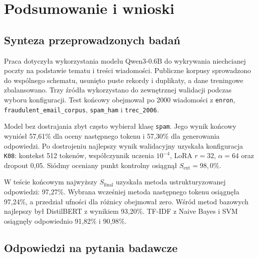 \chapter{Podsumowanie i wnioski}

\section{Synteza przeprowadzonych badań}

Praca dotyczyła wykorzystania modelu Qwen3-0.6B do wykrywania niechcianej
poczty na podstawie tematu i treści wiadomości. Publiczne korpusy sprowadzono
do wspólnego schematu, usunięto puste rekordy i duplikaty, a dane treningowe
zbalansowano. Trzy źródła wykorzystano do zewnętrznej walidacji podczas wyboru
konfiguracji. Test końcowy obejmował po 2000 wiadomości z \texttt{enron},
\texttt{fraudulent\_email\_corpus}, \texttt{spam\_ham} i \texttt{trec\_2006}.

Model bez dostrajania zbyt często wybierał klasę \texttt{spam}. Jego wynik
końcowy wyniósł 57,61\% dla oceny następnego tokenu i 57,30\% dla generowania
odpowiedzi. Po dostrojeniu najlepszy wynik walidacyjny uzyskała konfiguracja
\texttt{K08}: kontekst 512 tokenów, współczynnik uczenia \(10^{-4}\), LoRA
\(r=32\), \(\alpha=64\) oraz dropout 0,05. Siódmy oceniany punkt kontrolny
osiągnął \(S_{\mathrm{ext}}=98{,}0\%\).

W teście końcowym najwyższy \(S_{\mathrm{final}}\) uzyskała metoda
ustrukturyzowanej odpowiedzi: 97,27\%. Wybrana wcześniej metoda następnego
tokenu osiągnęła 97,24\%, a przedział ufności dla różnicy obejmował zero. Wśród
metod bazowych najlepszy był DistilBERT z wynikiem 93,20\%. TF-IDF z Naive
Bayes i SVM osiągnęły odpowiednio 91,82\% i 90,98\%.

\section{Odpowiedzi na pytania badawcze}

